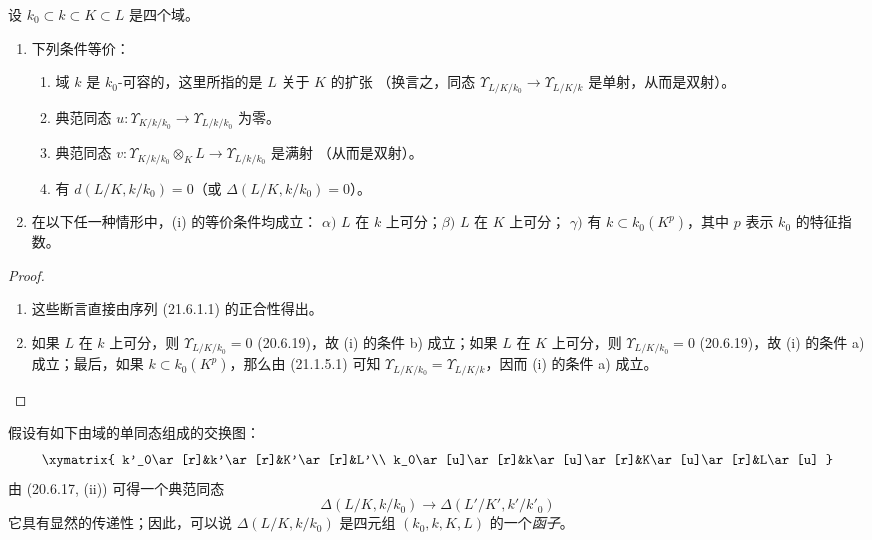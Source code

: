 \begin{proposition}[21.6.2]
\label{0.21.6.2-fr}
设 $k_0\subset k\subset K\subset L$ 是四个域。
\begin{enumerate}
  \item[\rm (i)] 下列条件等价：
  \begin{enumerate}
    \item[\rm a)] 域 $k$ 是 $k_0$-可容的，这里所指的是 $L$ 关于 $K$ 的扩张
    （换言之，同态 $\Upsilon_{L/K/k_0}\to
    \Upsilon_{L/K/k}$ 是单射，从而是双射）。
    \item[\rm b)] 典范同态
    $u:\Upsilon_{K/k/k_0}\to\Upsilon_{L/k/k_0}$ 为零。
    \item[\rm c)] 典范同态
    $v:\Upsilon_{K/k/k_0}\otimes_KL\to\Upsilon_{L/k/k_0}$ 是满射
    （从而是双射）。
    \item[\rm d)] 有 $d(L/K,k/k_0)=0$（或
    $\Delta(L/K,k/k_0)=0$）。
  \end{enumerate}
  \item[\rm (ii)] 在以下任一种情形中，(i) 的等价条件均成立：
  $\alpha)$ $L$ 在 $k$ 上可分；$\beta)$ $L$ 在 $K$ 上可分；
  $\gamma)$ 有 $k\subset k_0(K^p)$，其中 $p$ 表示 $k_0$ 的特征指数。
\end{enumerate}
\end{proposition}

\begin{proof}
\begin{enumerate}
  \item[(i)] 这些断言直接由序列 (21.6.1.1) 的正合性得出。
  \item[(ii)] 如果 $L$ 在 $k$ 上可分，则
  $\Upsilon_{L/K/k_0}=0$ (20.6.19)，故 (i) 的条件 b) 成立；如果 $L$
  在 $K$ 上可分，则 $\Upsilon_{L/K/k_0}=0$ (20.6.19)，故 (i) 的条件 a)
  成立；最后，如果 $k\subset k_0(K^p)$，那么由 (21.1.5.1) 可知
  $\Upsilon_{L/K/k_0}=\Upsilon_{L/K/k}$，因而 (i) 的条件 a) 成立。
\end{enumerate}
\end{proof}
\begin{env}[21.6.3]
\label{0.21.6.3-fr}
假设有如下由域的单同态组成的交换图：
\[
\xymatrix{
 k'_0\ar[r]&k'\ar[r]&K'\ar[r]&L'\\
 k_0\ar[u]\ar[r]&k\ar[u]\ar[r]&K\ar[u]\ar[r]&L\ar[u]
}
\]
由 (20.6.17, (ii)) 可得一个典范同态
\begin{equation}
\tag{21.6.3.1}
\label{0.21.6.3.1-fr}
\Delta(L/K,k/k_0)\longrightarrow\Delta(L'/K',k'/k'_0)
\end{equation}
它具有显然的传递性；因此，可以说 $\Delta(L/K,k/k_0)$ 是四元组
$(k_0,k,K,L)$ 的一个\emph{函子}。
\end{env}

